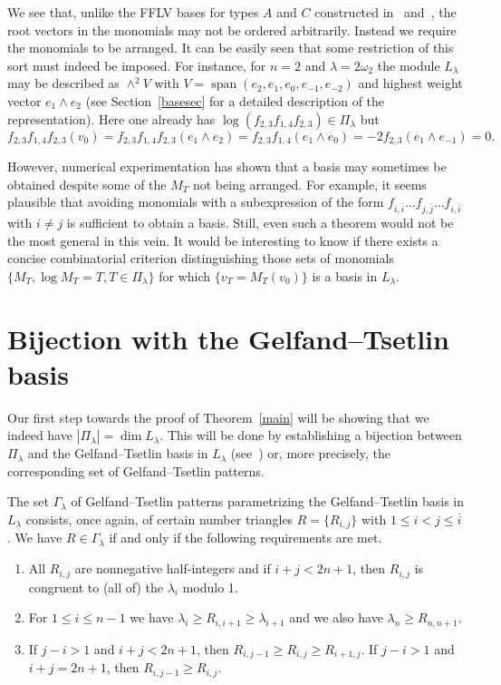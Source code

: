 \documentclass[ALCO,ThmDefs,Unicode]{cedram}
\DeclareMathOperator{\spanned}{span}
\newcommand{\la}{\lambda}
\begin{document}
\begin{rema}\label{remAC}
We see that, unlike the FFLV bases for types $A$ and $C$ constructed in~\cite{FFL1} and~\cite{FFL2}, the root vectors in the monomials may not be ordered arbitrarily. Instead we require the monomials to be arranged. It can be easily seen that some restriction of this sort must indeed be imposed. For instance, for $n=2$ and $\lambda=2\omega_2$ the module $L_\la$ may be described as $\wedge^2 V$ with $V=\spanned(e_2,e_1,e_0,e_{-1},e_{-2})$ and highest weight vector $e_1\wedge e_2$ (see Section~\ref{basesec} for a detailed description of the representation). Here one already has $\log(f_{2,3}f_{1,4}f_{2,3})\in\Pi_\lambda$ but
\[
f_{2,3}f_{1,4}f_{2,3}(v_0)=f_{2,3}f_{1,4}f_{2,3}(e_1\wedge e_2)=f_{2,3}f_{1,4}(e_1\wedge e_0)=-2f_{2,3}(e_1\wedge e_{-1})=0.
\]

However, numerical experimentation has shown that a basis may sometimes be obtained despite some of the $M_T$ not being arranged. For example, it seems plausible that avoiding monomials with a subexpression of the form $f_{i,\overline i}\dots f_{j,\overline j}\dots f_{i,\overline i}$ with $i\neq j$ is sufficient to obtain a basis. Still, even such a theorem would not be the most general in this vein. It would be interesting to know if there exists a concise combinatorial criterion distinguishing those sets of monomials $\{M_T, \log M_T=T, T\in\Pi_\la\}$ for which $\{v_T=M_T(v_0)\}$ is a basis in $L_\lambda$.
\end{rema}


\section{Bijection with the Gelfand--Tsetlin basis}

Our first step towards the proof of Theorem~\ref{main} will be showing that we indeed have $|\Pi_\la|=\dim L_\la$. This will be done by establishing a bijection between $\Pi_\la$ and the Gelfand--Tsetlin basis in $L_\la$ (see~\cite{Mo}) or, more precisely, the corresponding set of Gelfand--Tsetlin patterns.

The set $\Gamma_\la$ of Gelfand--Tsetlin patterns parametrizing the Gelfand--Tsetlin basis in $L_\la$ consists, once again, of certain number triangles $R=\{R_{i,j}\}$ with $1\le i<j\le \overline i$. We have $R\in\Gamma_\la$ if and only if the following requirements are met.
\begin{enumerate}
\item\label{sec2_1} All $R_{i,j}$ are nonnegative half-integers and if $i+j<2n+1$, then $R_{i,j}$ is congruent to (all of) the $\lambda_i$ modulo 1.
\item\label{sec2_2}  For $1\le i\le n-1$ we have $\lambda_i\ge R_{i,i+1}\ge\la_{i+1}$ and we also have $\la_n\ge R_{n,n+1}$.
\item\label{sec2_3}  If $j-i>1$ and $i+j<2n+1$, then $R_{i,j-1}\ge R_{i,j}\ge R_{i+1,j}$. If $j-i>1$ and $i+j=2n+1$, then $R_{i,j-1}\ge R_{i,j}$.
\end{enumerate}
\end{document}
